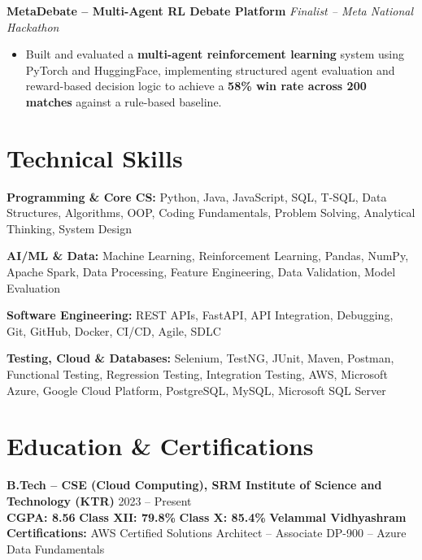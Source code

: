 \documentclass[12pt]{extarticle}
\begin{document}
\textbf{MetaDebate -- Multi-Agent RL Debate Platform}
\hfill \textit{Finalist -- Meta National Hackathon}

\begin{itemize}
    \item Built and evaluated a \textbf{multi-agent reinforcement learning}
    system using PyTorch and HuggingFace, implementing structured agent
    evaluation and reward-based decision logic to achieve a
    \textbf{58\% win rate across 200 matches} against a rule-based baseline.
\end{itemize}


\section*{Technical Skills}

{\fontsize{10.2}{11.7}\selectfont 

\textbf{Programming \& Core CS:} Python, Java, JavaScript, SQL, T-SQL,
Data Structures, Algorithms, OOP, Coding Fundamentals, Problem Solving,
Analytical Thinking, System Design 

\textbf{AI/ML \& Data:} Machine Learning, Reinforcement Learning, Pandas, NumPy, Apache Spark, Data Processing, Feature Engineering, Data Validation, Model Evaluation 

\textbf{Software Engineering:} REST APIs, FastAPI, API Integration, Debugging, Git, GitHub, Docker, CI/CD, Agile, SDLC 

\textbf{Testing, Cloud \& Databases:} Selenium, TestNG, JUnit, Maven, Postman, Functional Testing, Regression Testing, Integration Testing, AWS, Microsoft Azure, Google Cloud Platform, PostgreSQL, MySQL, Microsoft SQL Server

}


\section*{Education \& Certifications}

\textbf{B.Tech -- CSE (Cloud Computing), SRM Institute of Science and Technology (KTR)}
\hfill 2023 -- Present \\
\textbf{CGPA: 8.56} \quad\textbar\quad
\textbf{Class XII: 79.8\%} \quad\textbar\quad
\textbf{Class X: 85.4\%} \quad\textbar\quad
\textbf{Velammal Vidhyashram} \\
\textbf{Certifications:} AWS Certified Solutions Architect -- Associate
\quad\textbar\quad DP-900 -- Azure Data Fundamentals
\end{document}
